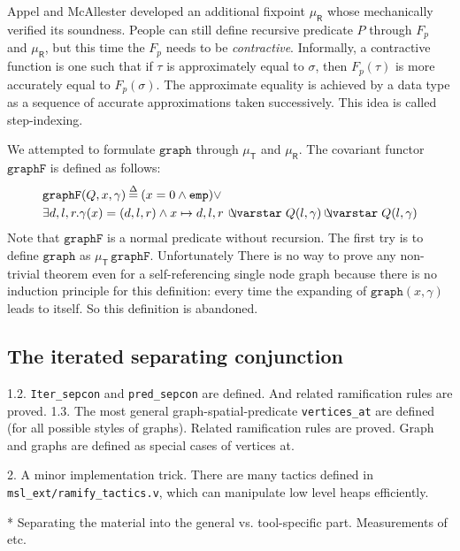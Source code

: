 Appel and McAllester developed an additional fixpoint
$\mu_{\mathsf{R}}$ \cite{appel:fixpoint} whose \cite{appel:vmm}
mechanically verified its soundness. People can still define recursive
predicate $P$ through $F_p$ and $\mu_{\mathsf{R}}$, but this time the
$F_p$ needs to be \emph{contractive}. Informally, a contractive
function is one such that if $\tau$ is approximately equal to
$\sigma$, then $F_p(\tau)$ is more accurately equal to
$F_p(\sigma)$. The approximate equality is achieved by a data type as
a sequence of accurate approximations taken successively. This idea is
called step-indexing.

We attempted to formulate $\mathtt{graph}$ through $\mu_{\mathsf{T}}$
and $\mu_{\mathsf{R}}$. The covariant functor $\mathtt{graphF}$ is
defined as follows:
\[\label{eqn:graphF}
  \begin{split}
  & \mathtt{graphF}(Q, x, \gamma)\defeq (x = 0 \wedge
  \mathtt{emp}) \vee \\ & \exists d,l,r . \gamma(x)=(d,l,r) \wedge  x
  \mapsto d,l,r\, \ocon Q(l, \gamma) \ocon Q(l, \gamma)
  \end{split}
\]
Note that $\mathtt{graphF}$ is a normal predicate without
recursion. The first try is to define $\mathtt{graph}$ as
$\mu_{\mathsf{T}}\,\mathtt{graphF}$. Unfortunately There is no way to
prove any non-trivial theorem even for a self-referencing single node
graph because there is no induction principle for this definition:
every time the expanding of $\mathtt{graph}(x,\gamma)$ leads to
itself. So this definition is abandoned.

\subsection{The iterated separating conjunction}
1.2. \texttt{Iter\_sepcon} and \texttt{pred\_sepcon} are defined. And related ramification rules are proved.
1.3. The most general graph-spatial-predicate \texttt{vertices\_at} are defined (for all possible styles of graphs). Related ramification rules are proved. Graph and graphs are defined as special cases of vertices at.

2. A minor implementation trick. There are many tactics defined in \texttt{msl\_ext/ramify\_tactics.v}, which can manipulate low level heaps efficiently.

* Separating the material into the general vs. tool-specific part.  Measurements of etc.
